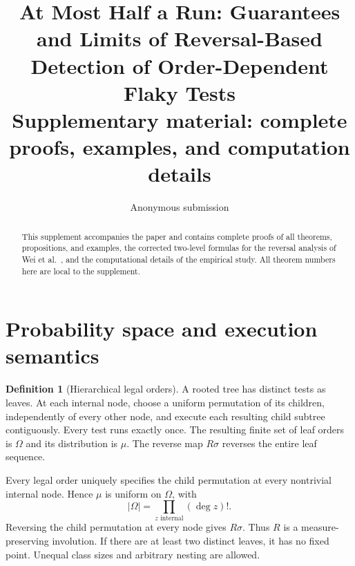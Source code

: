 \documentclass[11pt,a4paper]{article}
\title{At Most Half a Run: Guarantees and Limits of Reversal-Based\\Detection of Order-Dependent Flaky Tests\\[5pt]\large Supplementary material: complete proofs, examples, and computation details}
\author{Anonymous submission}
\date{}
\theoremstyle{definition}\newtheorem{definition}[theorem]{Definition}
\theoremstyle{remark}\newtheorem{remark}[theorem]{Remark}
\theoremstyle{definition}\newtheorem{xexample}[xtheorem]{Example}\theoremstyle{plain}
\begin{document}
\maketitle
\begin{abstract}
This supplement accompanies the paper and contains complete proofs of all theorems, propositions, and examples, the corrected two-level formulas for the reversal analysis of Wei et al.~\cite{wei}, and the computational details of the empirical study. All theorem numbers here are local to the supplement.
\end{abstract}
\setcounter{tocdepth}{1}
\begingroup\small\setlength{\parskip}{0pt}\tableofcontents\endgroup
\section{Probability space and execution semantics}
\begin{definition}[Hierarchical legal orders]
A rooted tree has distinct tests as leaves. At each internal node, choose a uniform permutation of its children, independently of every other node, and execute each resulting child subtree contiguously. Every test runs exactly once. The resulting finite set of leaf orders is $\Omega$ and its distribution is $\mu$. The reverse map $R\sigma$ reverses the entire leaf sequence.
\end{definition}
Every legal order uniquely specifies the child permutation at every nontrivial internal node. Hence $\mu$ is uniform on $\Omega$, with
\[
 |\Omega|=\prod_{z\text{ internal}}(\deg z)!.
\]
Reversing the child permutation at every node gives $R\sigma$. Thus $R$ is a measure-preserving involution. If there are at least two distinct leaves, it has no fixed point. Unequal class sizes and arbitrary nesting are allowed.
\end{document}
